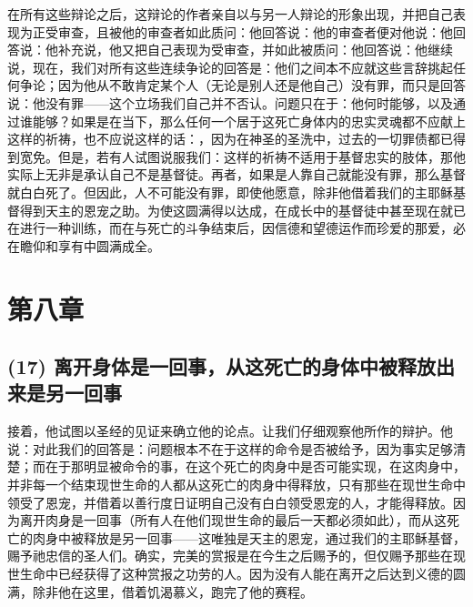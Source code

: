 在所有这些辩论之后，这辩论的作者亲自以与另一人辩论的形象出现，并把自己表现为正受审查，且被他的审查者如此质问：他回答说：他的审查者便对他说：他回答说：他补充说，他又把自己表现为受审查，并如此被质问：他回答说：他继续说，现在，我们对所有这些连续争论的回答是：他们之间本不应就这些言辞挑起任何争论；因为他从不敢肯定某个人（无论是别人还是他自己）没有罪，而只是回答说：他没有罪——这个立场我们自己并不否认。问题只在于：他何时能够，以及通过谁能够？如果是在当下，那么任何一个居于这死亡身体内的忠实灵魂都不应献上这样的祈祷，也不应说这样的话：，因为在神圣的圣洗中，过去的一切罪债都已得到宽免。但是，若有人试图说服我们：这样的祈祷不适用于基督忠实的肢体，那他实际上无非是承认自己不是基督徒。再者，如果是人靠自己就能没有罪，那么基督就白白死了。但因此，人不可能没有罪，即使他愿意，除非他借着我们的主耶稣基督得到天主的恩宠之助。为使这圆满得以达成，在成长中的基督徒中甚至现在就已在进行一种训练，而在与死亡的斗争结束后，因信德和望德运作而珍爱的那爱，必在瞻仰和享有中圆满成全。\par


\section{第八章}


\subsection{(17) 离开身体是一回事，从这死亡的身体中被释放出来是另一回事}

接着，他试图以圣经的见证来确立他的论点。让我们仔细观察他所作的辩护。他说：对此我们的回答是：问题根本不在于这样的命令是否被给予，因为事实足够清楚；而在于那明显被命令的事，在这个死亡的肉身中是否可能实现，在这肉身中，并非每一个结束现世生命的人都从这死亡的肉身中得释放，只有那些在现世生命中领受了恩宠，并借着以善行度日证明自己没有白白领受恩宠的人，才能得释放。因为离开肉身是一回事（所有人在他们现世生命的最后一天都必须如此），而从这死亡的肉身中被释放是另一回事——这唯独是天主的恩宠，通过我们的主耶稣基督，赐予祂忠信的圣人们。确实，完美的赏报是在今生之后赐予的，但仅赐予那些在现世生命中已经获得了这种赏报之功劳的人。因为没有人能在离开之后达到义德的圆满，除非他在这里，借着饥渴慕义，跑完了他的赛程。\par

